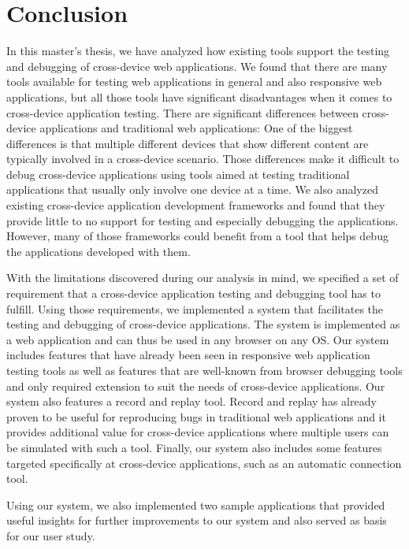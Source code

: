 \chapter{Conclusion}

In this master's thesis, we have analyzed how existing tools support the testing and debugging of cross-device web applications. We found that there are many tools available for testing web applications in general and also responsive web applications, but all those tools have significant disadvantages when it comes to cross-device application testing. There are significant differences between cross-device applications and traditional web applications: One of the biggest differences is that multiple different devices that show different content are typically involved in a cross-device scenario. Those differences make it difficult to debug cross-device applications using tools aimed at testing traditional applications that usually only involve one device at a time. We also analyzed existing cross-device application development frameworks and found that they provide little to no support for testing and especially debugging the applications. However, many of those frameworks could benefit from a tool that helps debug the applications developed with them.

With the limitations discovered during our analysis in mind, we specified a set of requirement that a cross-device application testing and debugging tool has to fulfill. Using those requirements, we implemented a system that facilitates the testing and debugging of cross-device applications. The system is implemented as a web application and can thus be used in any browser on any OS. Our system includes features that have already been seen in responsive web application testing tools as well as features that are well-known from browser debugging tools and only required extension to suit the needs of cross-device applications. Our system also features a record and replay tool. Record and replay has already proven to be useful for reproducing bugs in traditional web applications and it provides additional value for cross-device applications where multiple users can be simulated with such a tool. Finally, our system also includes some features targeted specifically at cross-device applications, such as an automatic connection tool. 

Using our system, we also implemented two sample applications that provided useful insights for further improvements to our system and also served as basis for our user study. 

